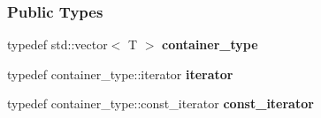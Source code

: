 \subsubsection*{Public Types}
\begin{DoxyCompactItemize}
\item 
typedef std\+::vector$<$ T $>$ {\bfseries container\+\_\+type}\hypertarget{classTCLAP_1_1MultiArg_adae435f03fdde769bca57327487aab78}{}\label{classTCLAP_1_1MultiArg_adae435f03fdde769bca57327487aab78}

\item 
typedef container\+\_\+type\+::iterator {\bfseries iterator}\hypertarget{classTCLAP_1_1MultiArg_a34196784baca2bd5aa079d639d49a7ca}{}\label{classTCLAP_1_1MultiArg_a34196784baca2bd5aa079d639d49a7ca}

\item 
typedef container\+\_\+type\+::const\+\_\+iterator {\bfseries const\+\_\+iterator}\hypertarget{classTCLAP_1_1MultiArg_a3f8e9e8f5dcc7d3e6a518f42134cf64f}{}\label{classTCLAP_1_1MultiArg_a3f8e9e8f5dcc7d3e6a518f42134cf64f}

\end{DoxyCompactItemize}
